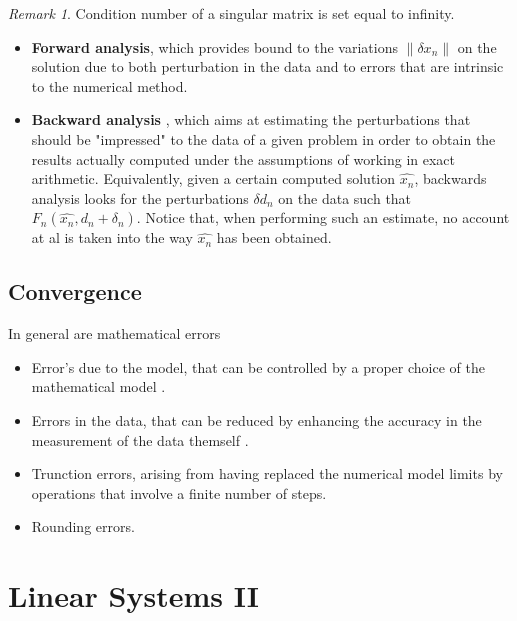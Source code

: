 \documentclass{article}
\theoremstyle{remark}
\newtheorem*{remark}{Remark}
\begin{document}
\begin{remark}
  Condition number of a singular matrix is set equal to infinity.
\end{remark}

\begin{definition}
  \begin{itemize}
    \item \textbf{Forward analysis}, which provides bound to the variations $\|\delta x_{n}\|$ on the solution due to both perturbation in the data and to errors that are intrinsic to the numerical method.
  \item \textbf{Backward analysis} , which aims at estimating the perturbations that should be "impressed" to the data of a given problem in order to obtain the results actually computed under the assumptions of working in exact arithmetic. Equivalently, given a certain computed solution $\hat{x_n}$, backwards analysis looks for the perturbations $\delta d_{n}$ on the data such that $F_{n} \left( \hat{x_n}, d_n + \delta_n \right)$. Notice that, when performing such an
    estimate, no account at al is taken into the way $\hat{x_{n}}$ has been obtained.
  \end{itemize}
\end{definition}
  
\subsection{Convergence}%
\label{sub:convergence}

In general are mathematical errors 
\begin{itemize}
  \item Error's due to the model, that can be controlled by a proper choice of the mathematical model . 
  \item Errors in the data, that can be reduced by enhancing the accuracy in the measurement of the data themself .
  \item Trunction errors, arising from having replaced the numerical model limits by operations that involve a finite number of steps.
  \item Rounding errors.
\end{itemize}

\newpage
\section{Linear Systems II}%
\label{sec:linear_systems_ii}
\end{document}
